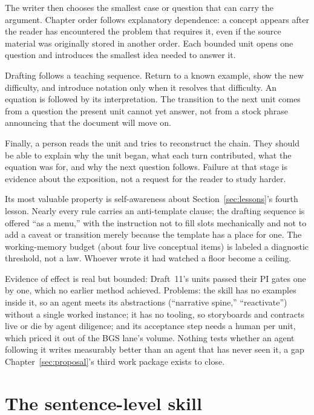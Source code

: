 The writer then chooses the smallest case or question that can carry the
argument. Chapter order follows explanatory dependence: a concept appears
after the reader has encountered the problem that requires it, even if the
source material was originally stored in another order. Each bounded unit
opens one question and introduces the smallest idea needed to answer it.

Drafting follows a teaching sequence. Return to a known example, show the new
difficulty, and introduce notation only when it resolves that difficulty. An
equation is followed by its interpretation. The transition to the next unit
comes from a question the present unit cannot yet answer, not from a stock
phrase announcing that the document will move on.

Finally, a person reads the unit and tries to reconstruct the chain. They
should be able to explain why the unit began, what each turn contributed, what
the equation was for, and why the next question follows. Failure at that stage
is evidence about the exposition, not a request for the reader to study harder.

Its most valuable property is self-awareness about
Section~\ref{sec:lessons}'s fourth lesson. Nearly every rule carries an
anti-template clause; the drafting sequence is offered ``as a menu,'' with
the instruction not to fill slots mechanically and not to add a caveat or
transition merely because the template has a place for one. The
working-memory budget (about four live conceptual items) is labeled a
diagnostic threshold, not a law. Whoever wrote it had watched a floor become
a ceiling.

Evidence of effect is real but bounded: Draft~11's units passed their PI
gates one by one, which no earlier method achieved. Problems: the skill has
no examples inside it, so an agent meets its abstractions (``narrative
spine,'' ``reactivate'') without a single worked instance; it has no tooling,
so storyboards and contracts live or die by agent diligence; and its
acceptance step needs a human per unit, which priced it out of the BGS lane's
volume. Nothing tests whether an agent following it writes measurably better
than an agent that has never seen it, a gap Chapter~\ref{sec:proposal}'s
third work package exists to close.

\section{The sentence-level skill}
\label{sec:tool-natural}

